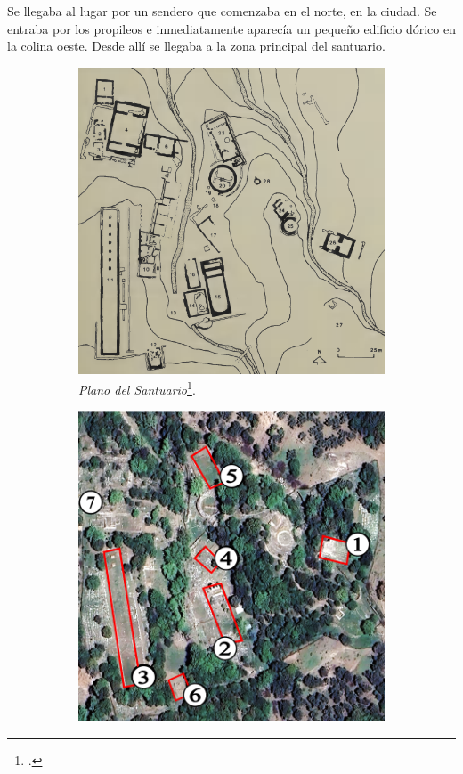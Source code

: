 Se llegaba al lugar por un sendero que comenzaba en el norte, en la ciudad. Se entraba por los propileos e inmediatamente aparecía un  pequeño edificio dórico en la colina oeste. Desde allí se llegaba a la zona principal del santuario.

\begin{figure}[h!]
	\centering
	\begin{subfigure}[t]{0.45\linewidth}
		\centering
		\includegraphics[width=\linewidth]{Imagenes/PlanoSantuarioDeSamotracia}
		\caption{\textit{Plano del Santuario}\footcite[8]{guettelcoleTheoiMegaloiCult1984}.}
		\label{fig:santuario-samotracia}
	\end{subfigure}
	\begin{subfigure}[t]{0.45\linewidth}
		\centering
		\includegraphics[width=\linewidth]{Imagenes/VistaAereaSamotracia}

\end{subfigure}
\end{figure}
